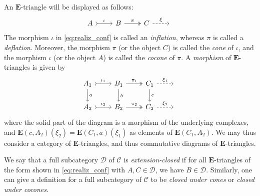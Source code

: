 \documentclass[10pt,twoside, a4paper,reqno]{amsart}
\newcommand{\calC}{\mathcal{C}}
\newcommand{\E}{\mathbf{E}}
\theoremstyle{definition}
\begin{document}
An {$\E$-triangle} will be displayed as follows:
\begin{equation}\label{eq:realiz_conf}
\begin{tikzcd}
A \arrow[r,"\iota",tail]& B\arrow[r,"\pi",two heads]& C \arrow[r,dashed,"\xi"] & {}
\end{tikzcd}
\end{equation}
The morphism $\iota$ in \eqref{eq:realiz_conf} is called an \textit{inflation}, whereas $\pi$ is {called} a \textit{deflation}. Moreover, the morphism $\pi$ (or the object $C$) is {called} the \textit{cone} of $\iota$, and the morphism $
\iota$ (or the object $A$) is {called} the \textit{cocone} of $\pi$. {A \textit{morphism} of $\E$-triangles is given by}
\begin{equation*}\label{eq:morph_conf}
\begin{tikzcd}
A_1 \arrow[r,"\iota_1",tail]\arrow[d,"a"]& B_1 \arrow[r,"\pi_1",two heads]\arrow[d,"b"] & C_1 \arrow[r,dashed,"\xi_1"] \arrow[d,"c"] & {} \\
A_2 \arrow[r,"\iota_2",tail]& B_2 \arrow[r,"\pi_2",two heads]& C_2 \arrow[r,dashed,"\xi_2"] & {} 
\end{tikzcd}
\end{equation*}
{where the solid part of the diagram is a morphism of the underlying complexes, and $\E(c,A_2)(\xi_2) = \E(C_1,a)(\xi_1)$ as elements of $\E(C_1,A_2)$. We may thus consider a category of $\E$-triangles, and thus commutative diagrams of $\E$-triangles.}

We say that a full subcategory $\mathcal{D}$ of $\calC$ is \textit{extension-closed} if for {all $\E$-triangle}s of the form shown in \eqref{eq:realiz_conf} with $A,C\in\mathcal{D}$, we have $B\in \mathcal{D}$. Similarly, one can give a definition for a full subcategory of $\calC$ to be \textit{closed under cones} or \textit{closed under cocones}.
\end{document}
